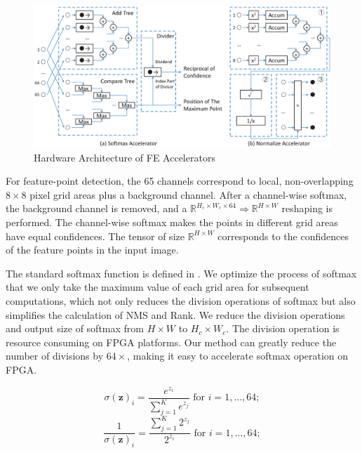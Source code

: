 \begin{figure}[t]
    \centering  
    \includegraphics[width=1\linewidth]{fig/FEaccelerator.eps}
    \caption{Hardware Architecture of FE Accelerators}
    \label{fig:FEaccelerator}
\end{figure}

For feature-point detection, the 65 channels correspond to local, non-overlapping $8 \times 8$ pixel grid areas plus a background channel. 
After a channel-wise softmax, the background channel is removed, and a $\mathbb{R}^{H_c\times W_c\times64}\Rightarrow \mathbb{R}^{H\times W}$ reshaping is performed. 
The channel-wise softmax makes the points in different grid areas have equal confidences.
The tensor of size $\mathbb{R}^{H\times W}$ corresponds to the confidences of the feature points in the input image.

The standard softmax function is defined in .
We optimize the process of softmax that we only take the maximum value of each grid area for subsequent computations, which not only reduces the division operations of softmax but also simplifies the calculation of NMS and Rank.
We reduce the division operations and output size of softmax from $H \times W$ to $H_c \times W_c$.
The division operation is resource consuming on FPGA platforms. 
Our method can greatly reduce the number of divisions by $64 \times$, making it easy to accelerate softmax operation on FPGA.

\begin{equation}
    \sigma (\mathbf {z} )_{i}={\frac {e^{z_{i}}}{\sum _{j=1}^{K}e^{z_{j}}}}{\text{ for }}i=1,\dotsc ,64;
    \label{equ:softmax_o}
\end{equation}
\begin{equation}
    \frac{1}{\sigma (\mathbf {z} )_{i}}={\frac {\sum _{j=1}^{K}2^{z_{j}}}{2^{z_{i}}}}{\text{ for }}i=1,\dotsc ,64;
    \label{equ:softmax_hard}
\end{equation}

